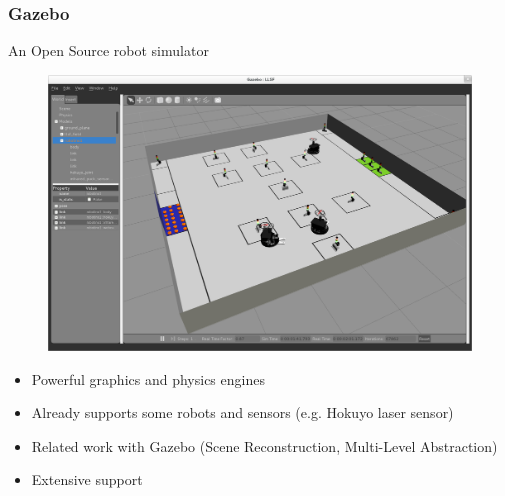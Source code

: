 \documentclass[]{beamer}
\begin{document}
\begin{frame}
  \frametitle{Gazebo}
  \begin{multicols}{2}
    An Open Source robot simulator
    \begin{figure}
      \includegraphics[scale=0.115]{../pics/gazebo_window.png}
    \end{figure}
    \begin{itemize}
    \item Powerful graphics and physics engines %
    \item Already supports some robots and sensors (e.g. Hokuyo laser sensor)
    \item Related work with Gazebo (Scene Reconstruction, Multi-Level Abstraction)
    \item Extensive support
    \end{itemize}
  \end{multicols}
\end{frame}
\end{document}

